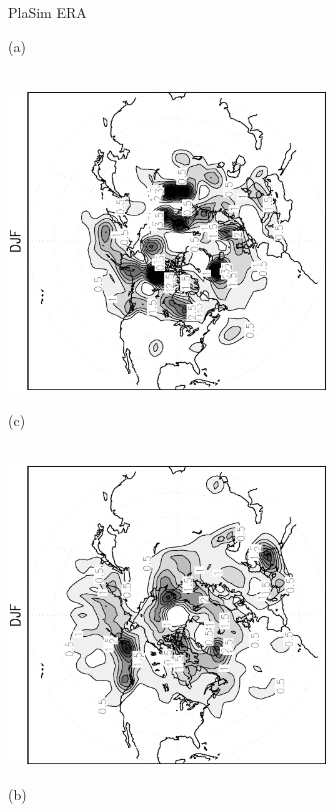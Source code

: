 \documentclass[12pt,a4paper,twoside,openright,headinclude,liststotoc,bibtotoc]{scrreprt}
\begin{document}
\begin{appendix}
\begin{figure}[c]
\hspace{3.8cm}PlaSim \vspace{0.2cm} \hspace{7.3cm} ERA \\
\parbox{8.5cm}{\hspace{0.95cm}\begin{scriptsize}(a)\end{scriptsize} \vspace{-0.5cm} \\
\includegraphics[height=8.0cm,angle=-90]
{eps/cycllys_PLASIM_T21_45DJF.eps}
}
\parbox{8.5cm}{\hspace{0.95cm}\begin{scriptsize}(c)\end{scriptsize} \vspace{-0.5cm} \\
\includegraphics[height=8.0cm,angle=-90]
{eps/cycllys_ERA40_T21_45DJF.eps}
}
\parbox{8.5cm}{\hspace{0.95cm}\begin{scriptsize}(b)\end{scriptsize} \vspace{-0.5cm} \\
}
\end{figure}
\end{appendix}
\end{document}
